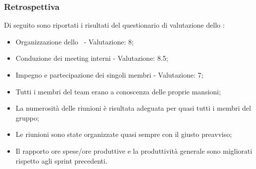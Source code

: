 \subsubsection{Retrospettiva}

\par Di seguito sono riportati i risultati del questionario di valutazione dello :
\begin{itemize}
  \item Organizzazione dello \ - Valutazione: 8;
  \item Conduzione dei meeting interni - Valutazione: 8.5;
  \item Impegno e partecipazione dei singoli membri - Valutazione: 7;
  \item Tutti i membri del team erano a conoscenza delle proprie mansioni;
  \item La numerosità delle riunioni è risultata adeguata per quasi tutti i membri del gruppo;
  \item Le riunioni sono state organizzate quasi sempre con il giusto preavviso;
  \item Il rapporto ore spese/ore produttive e la produttività generale sono migliorati rispetto agli sprint precedenti.
\end{itemize}


